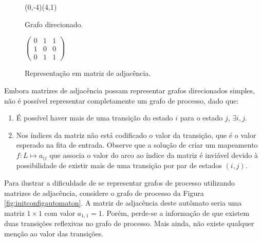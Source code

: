 \documentclass[12pt,a4paper]{article}
\let\vState=\origState
\begin{document}
\begin{figure}[ht]
\begin{minipage}[b]{0.5\linewidth}
\begin{center}
\begin{VCPicture}{(0,-4)(4,1)}
\vState[1]{(0,0)}{A} \vState[2]{(4,0)}{B}
\vState[3]{(2,-2)}{C}
 
 
\end{VCPicture}
\caption{Grafo direcionado.}
\label{fig:graph}
\end{center}
\end{minipage}
\hspace{0.5cm}
\begin{minipage}[b]{0.5\linewidth}
\begin{center}
\begin{math}
\begin{pmatrix}
0 & 1 & 1 \\
1 & 0 & 0 \\
0 & 1 & 1
\end{pmatrix}
\end{math}
\caption{Representação em matriz de adjacência.}
\label{fig:adjm}
\end{center}
\end{minipage}
\end{figure}

Embora matrizes de adjacência possam representar grafos direcionados simples,
não é possível representar completamente um grafo de processo, dado que:

\begin{enumerate}
\item É possível haver mais de uma transição do estado $i$ para o estado
$j$, $\exists i,j$.

\item Nos índices da matriz não está codificado o valor da transição, que
é o valor esperado na fita de entrada. Observe que a solução de criar
um mapeamento $f: L \mapsto a_{ij}$ que associa o valor do arco ao índice
da matriz é inviável devido à possibilidade de existir mais de uma
transição por par de estados $(i,j)$.
\end{enumerate}

Para ilustrar a dificuldade de se representar grafos de processo utilizando
matrizes de adjacência, considere o grafo de processo da Figura
\ref{fig:initconfigautomaton}. A matriz de adjacência deste autômato
seria uma matriz $1 \times 1$ com valor $a_{1,1}=1$. Porém, perde-se a informação
de que existem duas transições reflexivas no grafo de processo. Mais ainda,
não existe qualquer menção ao valor das transições.
\end{document}
